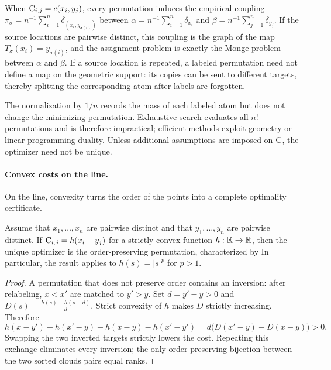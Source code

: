 When $\mathrm{C}_{i,j}=c(x_i,y_j)$, every permutation induces the empirical coupling $\pi_\sigma=n^{-1}\sum_{i=1}^n\delta_{(x_i,y_{\sigma(i)})}$ between $\alpha=n^{-1}\sum_{i=1}^n\delta_{x_i}$ and $\beta=n^{-1}\sum_{j=1}^n\delta_{y_j}$. If the source locations are pairwise distinct, this coupling is the graph of the map $T_\sigma(x_i)=y_{\sigma(i)}$, and the assignment problem is exactly the Monge problem between $\alpha$ and $\beta$. If a source location is repeated, a labeled permutation need not define a map on the geometric support: its copies can be sent to different targets, thereby splitting the corresponding atom after labels are forgotten.

The normalization by $1/n$ records the mass of each labeled atom but does not change the minimizing permutation. Exhaustive search evaluates all $n!$ permutations and is therefore impractical; efficient methods exploit geometry or linear-programming duality. Unless additional assumptions are imposed on $\mathrm{C}$, the optimizer need not be unique.

\paragraph{Convex costs on the line.}

On the line, convexity turns the order of the points into a complete optimality certificate.

\begin{proposition}\label{prop-matching-1d-monotone}
Assume that $x_1,\ldots,x_n$ are pairwise distinct and that $y_1,\ldots,y_n$ are pairwise distinct. If $\mathrm{C}_{i,j}=h(x_i-y_j)$ for a strictly convex function $h:\mathbb{R}\to\mathbb{R}$, then the unique optimizer is the order-preserving permutation, characterized by
In particular, the result applies to $h(s)=|s|^p$ for $p>1$.
\end{proposition}
\begin{proof}
	A permutation that does not preserve order contains an inversion: after relabeling, $x<x'$ are matched to $y'>y$. Set $d=y'-y>0$ and
	\(D(s)=\frac{h(s)-h(s-d)}{d}\).
	Strict convexity of $h$ makes $D$ strictly increasing. Therefore
		\[
			h(x-y')+h(x'-y)-h(x-y)-h(x'-y')
			=d\bigl(D(x'-y)-D(x-y)\bigr)>0.
		\]
	Swapping the two inverted targets strictly lowers the cost. Repeating this exchange eliminates every inversion; the only order-preserving bijection between the two sorted clouds pairs equal ranks.
\end{proof}

